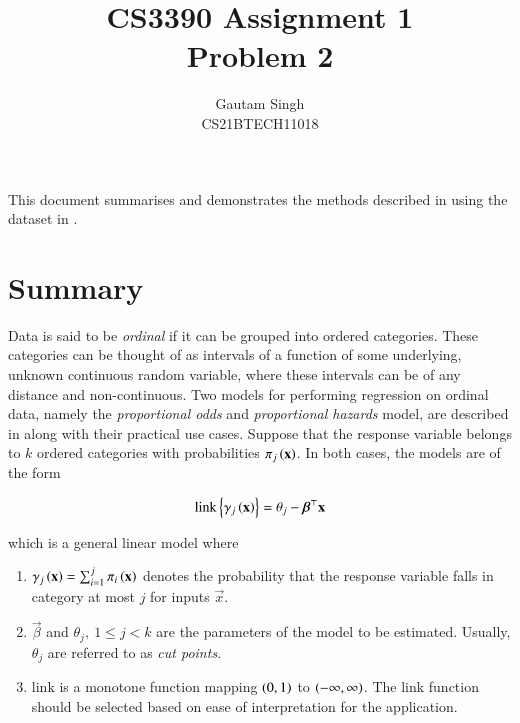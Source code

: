 \documentclass[journal,12pt,twocolumn]{IEEEtran}
\begin{document}
\vspace{3cm}
\title{CS3390 Assignment 1\\Problem 2}
\author{Gautam Singh\\CS21BTECH11018}
\maketitle
\tableofcontents
\bigskip

This document summarises and demonstrates the methods described in \cite{PMC80}
using the dataset in \cite{misc_wine_quality_186}.

\section{Summary}

Data is said to be \emph{ordinal} if it can be grouped into ordered categories.
These categories can be thought of as intervals of a function of some
underlying, unknown continuous random variable, where these intervals can be of
any distance and non-continuous. Two models for performing regression on ordinal
data, namely the \emph{proportional odds} and \emph{proportional hazards} model,
are described in \cite{PMC80} along with their practical use cases. Suppose that
the response variable belongs to \(k\) ordered categories with probabilities
\(\pi_j\left(\boldsymbol{\mathbf{x}}\right)\). In both cases, the models are of the form

\begin{equation}
     \mathrm{link}\left\{\gamma_j\left(\boldsymbol{\mathbf{x}}\right)\right\} = \theta_j - \boldsymbol{\mathbf{\beta}}^\top\boldsymbol{\mathbf{x}}
     \label{eq:ord-reg-model}
\end{equation}

which is a general linear model where 

\begin{enumerate}
     \item \(\gamma_j\left(\boldsymbol{\mathbf{x}}\right) = \sum_{i=1}^j \pi_i\left(\boldsymbol{\mathbf{x}}\right)\) denotes
     the probability that the response variable falls in category at most \(j\)
     for inputs \(\vec{x}\).
     \item \(\vec{\beta}\) and \(\theta_j,\ 1 \le j < k\) are the parameters of the model to
     be estimated. Usually, \(\theta_j\) are referred to as \emph{cut points}.
     \item \(\mathrm{link}\) is a monotone function mapping \(\left(0,1\right)\) to
     \(\left(-\infty,\infty\right)\). The link function should be selected based on
     ease of interpretation for the application.
\end{enumerate}
\end{document}
